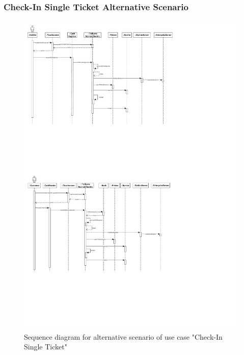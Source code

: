 \subsubsection{Check-In Single Ticket Alternative Scenario}

\begin{figure}
\centerline{\includegraphics[width=1.4\columnwidth]{"img/sequence_diagrams/SequenceDiagram_CheckInSingleTicket_card"}}
\caption{Sequence diagram for alternative scenario of use case "Check-In Single Ticket"}
\label{fig:seq_single_ticket_alt}
\end{figure}

